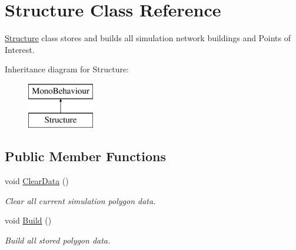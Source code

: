 \hypertarget{class_structure}{}\section{Structure Class Reference}
\label{class_structure}


\mbox{\hyperlink{class_structure}{Structure}} class stores and builds all simulation network buildings and Points of Interest.  


Inheritance diagram for Structure\+:\begin{figure}[H]
\begin{center}
\leavevmode
\includegraphics[height=2.000000cm]{class_structure}
\end{center}
\end{figure}
\subsection*{Public Member Functions}
\begin{DoxyCompactItemize}
\item 
void \mbox{\hyperlink{class_structure_a403435d05e2eec3c6ede0d842ad67b53}{Clear\+Data}} ()
\begin{DoxyCompactList}\small\item\em Clear all current simulation polygon data. \end{DoxyCompactList}\item 
void \mbox{\hyperlink{class_structure_a8603f9a973205d3dcaf81710fa79158d}{Build}} ()
\begin{DoxyCompactList}\small\item\em Build all stored polygon data. \end{DoxyCompactList}\end{DoxyCompactItemize}
